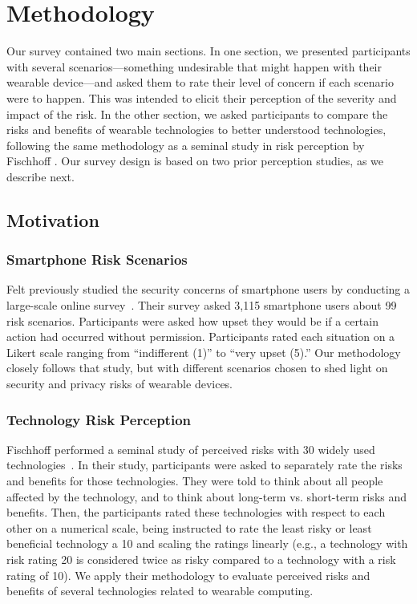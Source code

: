 
\section{Methodology}

Our survey contained two main sections.
In one section, we presented participants with several scenarios---something undesirable that might happen with their wearable device---and asked them to rate their level of concern if each scenario were to happen.
This was intended to elicit their perception of the severity and impact of the risk.
In the other section, we asked participants to compare the risks and benefits of wearable technologies to better understood technologies, following the same methodology as a seminal study in risk perception by Fischhoff \etal \cite{Fischhoff}.
Our survey design is based on two prior perception studies, as we describe next.

\subsection{Motivation}
\subsubsection{Smartphone Risk Scenarios}
Felt \etal previously studied the security concerns of smartphone users by conducting a large-scale online survey~\cite{Felt}. Their survey asked 3,115 smartphone users about 99 risk scenarios. Participants were asked how upset they would be if a certain action had occurred without permission. Participants rated each situation on a Likert scale ranging from ``indifferent (1)'' to ``very upset (5).''
Our methodology closely follows that study, but with different scenarios chosen to shed light on security and privacy risks of wearable devices.

\subsubsection{Technology Risk Perception}
Fischhoff \etal performed a seminal study of perceived risks with 30 widely used technologies~\cite{Fischhoff}. In their study, participants were asked to separately rate the risks and benefits for those technologies. They were told to think about all people affected by the technology, and to think about long-term vs. short-term risks and benefits. Then, the participants rated these technologies with respect to each other on a numerical scale, being instructed to rate the least risky or least beneficial technology a 10 and scaling the ratings linearly (e.g., a technology with risk rating 20 is considered twice as risky compared to a technology with a risk rating of 10).
We apply their methodology to evaluate perceived risks and benefits of several technologies related to wearable computing.

